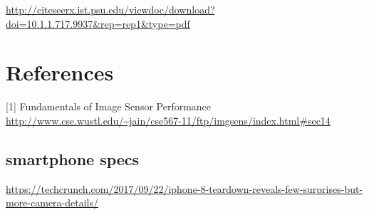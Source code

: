 \documentclass{article}
\begin{document}
\url{http://citeseerx.ist.psu.edu/viewdoc/download?doi=10.1.1.717.9937&rep=rep1&type=pdf}


\section{References}
[1] Fundamentals of Image Sensor Performance \url{http://www.cse.wustl.edu/~jain/cse567-11/ftp/imgsens/index.html#sec14}

\subsection{smartphone specs}
\url{https://techcrunch.com/2017/09/22/iphone-8-teardown-reveals-few-surprises-but-more-camera-details/}
\end{document}
